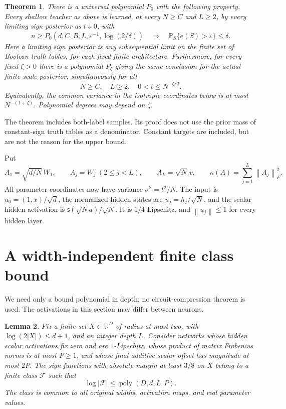 \documentclass[11pt]{article}
\newtheorem{theorem}{Theorem}[section]
\newtheorem{lemma}[theorem]{Lemma}
\theoremstyle{remark}\newtheorem{remark}[theorem]{Remark}
\newcommand{\Prb}{\mathbb P}
\newcommand{\R}{\mathbb R}
\newcommand{\norm}[1]{\left\lVert #1\right\rVert}
\newcommand{\sig}{\mathsf s}
\newcommand{\poly}{\operatorname{poly}}
\begin{document}
\begin{theorem}\label{thm:main}
There is a universal polynomial $P_0$ with the following property. Every
shallow teacher as above is learned, at every $N\ge C$ and $L\ge2$, by
every limiting sign posterior as $t\downarrow0$, with
\[
 n\ge P_0(d,C,B,L,\varepsilon^{-1},\log(2/\delta))
 \quad\Longrightarrow\quad
 \Prb_S\{e(S)>\varepsilon\}\le\delta.
\]
Here a limiting sign posterior is any subsequential limit on the finite
set of Boolean truth tables, for each fixed finite architecture.
Furthermore, for every fixed $\zeta>0$ there is a polynomial $P_\zeta$
giving the same conclusion for the actual finite-scale posterior,
simultaneously for all
\[
 N\ge C,\quad L\ge2,\quad 0<t\le N^{-\zeta/2}.
\]
Equivalently, the common variance in the isotropic coordinates below is
at most $N^{-(1+\zeta)}$. Polynomial degrees may depend on $\zeta$.
\end{theorem}

The theorem includes both-label samples. Its proof does not use the prior
mass of constant-sign truth tables as a denominator. Constant targets are
included, but are not the reason for the upper bound.

Put
\[
 A_1=\sqrt{d/N}\,W_1,\qquad A_j=W_j\ (2\le j<L),\qquad
 A_L=\sqrt N\,v,\qquad
 \kappa(A)=\sum_{j=1}^L\norm{A_j}_F^2.
\]
All parameter coordinates now have variance $\sigma^2=t^2/N$. The input is
$u_0=(1,x)/\sqrt d$, the normalized hidden states are $u_j=h_j/\sqrt N$,
and the scalar hidden activation is
$\sig(\sqrt N a)/\sqrt N$. It is $1/4$-Lipschitz, and
$\norm{u_j}\le1$ for every hidden layer.

\section{A width-independent finite class bound}

We need only a bound polynomial in depth; no circuit-compression theorem
is used. The activations in this section may differ between neurons.

\begin{lemma}\label{lem:cover}
Fix a finite set $X\subset\R^D$ of radius at most two, with
$\log(2|X|)\le d+1$, and an integer depth $L$. Consider networks whose
hidden scalar activations fix zero and are $1$-Lipschitz, whose product of
matrix Frobenius norms is at most $P\ge1$, and whose final additive scalar
offset has magnitude at most $2P$. The sign functions with absolute
margin at least $3/8$ on $X$ belong to a finite class $\mathcal F$ such that
\[
 \log|\mathcal F|\le\poly(D,d,L,P).
\]
The class is common to all original widths, activation maps, and real
parameter values.
\end{lemma}
\end{document}
